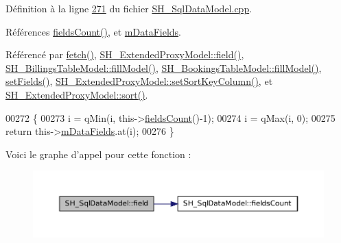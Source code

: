Définition à la ligne \hyperlink{SH__SqlDataModel_8cpp_source_l00271}{271} du fichier \hyperlink{SH__SqlDataModel_8cpp_source}{S\-H\-\_\-\-Sql\-Data\-Model.\-cpp}.



Références \hyperlink{classSH__SqlDataModel_a0fd7bd5380ce0ba9a2ca84033093432d}{fields\-Count()}, et \hyperlink{classSH__SqlDataModel_a3e998f75dd5b3193783612002461888d}{m\-Data\-Fields}.



Référencé par \hyperlink{classSH__SqlDataModel_a8d9b08d282a304945b9ee2f474020980}{fetch()}, \hyperlink{classSH__ExtendedProxyModel_ac73fae31c6ad69663b4df97f65ec945f}{S\-H\-\_\-\-Extended\-Proxy\-Model\-::field()}, \hyperlink{classSH__BillingsTableModel_a71a4e8482cf80dfca43a009400d7b96e}{S\-H\-\_\-\-Billings\-Table\-Model\-::fill\-Model()}, \hyperlink{classSH__BookingsTableModel_a3531ec1df4b0fb132b706bab80c29995}{S\-H\-\_\-\-Bookings\-Table\-Model\-::fill\-Model()}, \hyperlink{classSH__SqlDataModel_a1a345d536e6e08a03cb333351ce677af}{set\-Fields()}, \hyperlink{classSH__ExtendedProxyModel_ad1eb97a28d23e9aba8174bd5ffd7a5e4}{S\-H\-\_\-\-Extended\-Proxy\-Model\-::set\-Sort\-Key\-Column()}, et \hyperlink{classSH__ExtendedProxyModel_a5ed9b14df78667efe8b22d19617d6c4b}{S\-H\-\_\-\-Extended\-Proxy\-Model\-::sort()}.


\begin{DoxyCode}
00272 \{
00273     i = qMin(i, this->\hyperlink{classSH__SqlDataModel_a0fd7bd5380ce0ba9a2ca84033093432d}{fieldsCount}()-1);
00274     i = qMax(i, 0);
00275     \textcolor{keywordflow}{return} this->\hyperlink{classSH__SqlDataModel_a3e998f75dd5b3193783612002461888d}{mDataFields}.at(i);
00276 \}
\end{DoxyCode}


Voici le graphe d'appel pour cette fonction \-:\nopagebreak
\begin{figure}[H]
\begin{center}
\leavevmode
\includegraphics[width=350pt]{classSH__SqlDataModel_a442cdea9007cb61ed9d2fbdd01ddccbf_cgraph}
\end{center}
\end{figure}




